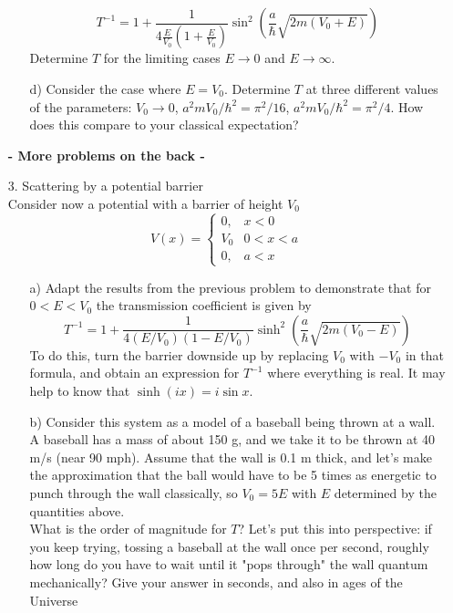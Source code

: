 \documentclass[11pt]{article}
\begin{document}
\begin{itemize}
\begin{itemize}
\begin{displaymath}
T^{-1} = 1 + \frac{1}{4\frac{E}{V_0}\left(1+\frac{E}{V_0}\right)}\sin^2\left(\frac{a}{\hbar}\sqrt{2m(V_0+E)}\right)
\end{displaymath}
Determine $T$ for the limiting cases $E \rightarrow 0$ and $E \rightarrow \infty$.
\item[d)]
Consider the case where $E = V_0$. Determine $T$ at three different values of the parameters:
$V_0 \rightarrow 0$, $a^2mV_0/\hbar^2 = \pi^2/16$, $a^2mV_0/\hbar^2 = \pi^2/4$.
How does this compare to your classical expectation?
\end{itemize}
%
\centerline{\bf - More problems on the back -}
%
\item[3.] Scattering by a potential barrier\\
Consider now a potential with a barrier of height $V_0$
\begin{displaymath}
V(x) =
\begin{cases}
0, &x < 0\\
V_0&0 < x < a\\
0, &a < x
\end{cases}
\end{displaymath}
\begin{itemize}
\item[a)]
Adapt the results from the previous problem to demonstrate that for $0<E<V_0$ the transmission coefficient is given by
\begin{displaymath}
T^{-1} = 1+\frac{1}{4(E/V_0)(1-E/V_0)}\sinh^2\left(\frac{a}{\hbar}\sqrt{2m(V_0-E)}\right)
\end{displaymath}
To do this, turn the barrier downside up by replacing $V_0$ with $-V_0$ in that formula,
and obtain an expression for $T^{-1}$ where everything is real. It may help to know
that $\sinh(ix) = i \sin x$.
\item[b)]
Consider this system as a model of a baseball being thrown at a wall. A baseball has a
mass of about 150 g, and we take it to be thrown at 40 m/s (near 90 mph). Assume that the wall is
0.1 m thick, and let's make the approximation that the ball would have to be 5 times as energetic
to punch through the wall classically, so $V_0 = 5E$ with $E$ determined by the quantities above.\\
What is the order of magnitude for $T$? Let's put this into perspective: if you keep trying, tossing
a baseball at the wall once per second, roughly how long do you have to wait until it "pops through"
the wall quantum mechanically? Give your answer in seconds, and also in ages of the Universe

\end{itemize}
\end{itemize}
\end{document}
